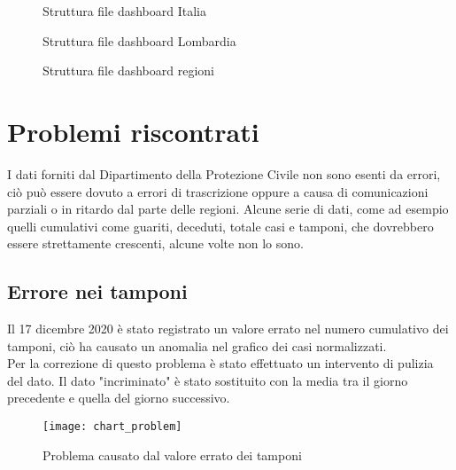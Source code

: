 \begin{figure}
\centering
\begin{minipage}{.3\linewidth}
\caption{Struttura file dashboard Italia}
\label{fig:tree_italia}
\end{minipage}\hfill
\begin{minipage}{.3\linewidth}
\caption{Struttura file dashboard Lombardia}
\label{fig:tree_lombardia}
\end{minipage}
\end{figure}
\begin{figure}
\centering
\begin{minipage}{.3\linewidth}
\caption{Struttura file dashboard regioni}
\label{fig:tree_regioni}
\end{minipage}\hfill
\end{figure}

\section{Problemi riscontrati}
I dati forniti dal Dipartimento della Protezione Civile non sono esenti da errori, ciò può essere dovuto a errori di trascrizione oppure a causa di comunicazioni parziali o in ritardo dal parte delle regioni.
Alcune serie di dati, come ad esempio quelli cumulativi come guariti, deceduti, totale casi e tamponi, che dovrebbero essere strettamente crescenti, alcune volte non lo sono.

\subsection{Errore nei tamponi}
Il 17 dicembre 2020 è stato registrato un valore errato nel numero cumulativo dei tamponi, ciò ha causato un anomalia nel grafico dei casi normalizzati.\\
Per la correzione di questo problema è stato effettuato un intervento di pulizia del dato.
Il dato "incriminato" è stato sostituito con la media tra il giorno precedente e quella del giorno successivo.
\begin{figure}[htp]
    \centering
    \texttt{[image: chart\_problem]}
    \caption{Problema causato dal valore errato dei tamponi}
\end{figure}